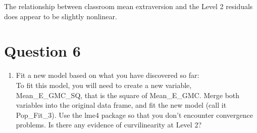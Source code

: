 \documentclass[]{article}
\providecommand{\tightlist}{%
  \setlength{\itemsep}{0pt}\setlength{\parskip}{0pt}}
\begin{document}
The relationship between classroom mean extraversion and the Level 2
residuals does appear to be slightly nonlinear.

\section{Question 6}\label{question-6}

\begin{enumerate}
\def\labelenumi{\arabic{enumi}.}
\setcounter{enumi}{5}
\tightlist
\item
  Fit a new model based on what you have discovered so far:\\
  To fit this model, you will need to create a new variable,
  Mean\_E\_GMC\_SQ, that is the square of Mean\_E\_GMC. Merge both
  variables into the original data frame, and fit the new model (call it
  Pop\_Fit\_3). Use the lme4 package so that you don't encounter
  convergence problems. Is there any evidence of curvilinearity at Level
  2?
\end{enumerate}
\end{document}
